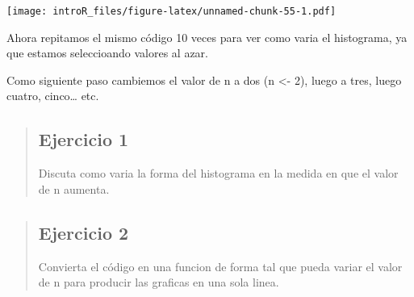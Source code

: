 \documentclass[
]{book}
\newenvironment{Shaded}{\begin{snugshade}}{\end{snugshade}}
\newcommand{\CommentTok}[1]{\textcolor[rgb]{0.56,0.35,0.01}{\textit{#1}}}
\newcommand{\ControlFlowTok}[1]{\textcolor[rgb]{0.13,0.29,0.53}{\textbf{#1}}}
\newcommand{\DataTypeTok}[1]{\textcolor[rgb]{0.13,0.29,0.53}{#1}}
\newcommand{\DecValTok}[1]{\textcolor[rgb]{0.00,0.00,0.81}{#1}}
\newcommand{\KeywordTok}[1]{\textcolor[rgb]{0.13,0.29,0.53}{\textbf{#1}}}
\newcommand{\NormalTok}[1]{#1}
\newcommand{\OperatorTok}[1]{\textcolor[rgb]{0.81,0.36,0.00}{\textbf{#1}}}
\newcommand{\OtherTok}[1]{\textcolor[rgb]{0.56,0.35,0.01}{#1}}
\newcommand{\StringTok}[1]{\textcolor[rgb]{0.31,0.60,0.02}{#1}}
\begin{document}
\begin{Shaded}
\end{Shaded}

\texttt{[image: introR\_files/figure-latex/unnamed-chunk-55-1.pdf]}

Ahora repitamos el mismo código 10 veces para ver como varia el histograma, ya que estamos seleccioando valores al azar.

Como siguiente paso cambiemos el valor de n a dos (n \textless- 2), luego a tres, luego cuatro, cinco\ldots{} etc.

\begin{quote}
\hypertarget{ejercicio-1-1}{%
\subsection{Ejercicio 1}\label{ejercicio-1-1}}

Discuta como varia la forma del histograma en la medida en que el valor de n aumenta.
\end{quote}

\begin{quote}
\hypertarget{ejercicio-2}{%
\subsection{Ejercicio 2}\label{ejercicio-2}}

Convierta el código en una funcion de forma tal que pueda variar el valor de n para producir las graficas en una sola linea.
\end{quote}
\end{document}
